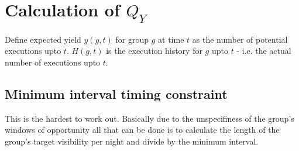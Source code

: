 \section{Calculation of $Q_Y$}
\label{sect:app_calcqy}

Define expected yield $y(g,t)$ for group $g$ at time $t$ as the number of potential executions upto $t$. $H(g,t)$ is the execution history for $g$ upto $t$ - i.e. the actual number of executions upto $t$. 

\subsection{Minimum interval timing constraint}
This is the hardest to work out. Basically due to the unspecifiness of the group's windows of opportunity all that can be done is to calculate the length of the group's target visibility per night and divide by the minimum interval.
